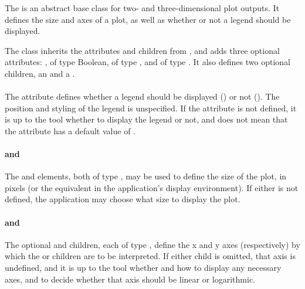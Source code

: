 \begin{blockChanged}


\subsubsection{}
\label{class:plot}
The \Plot is an abstract base class for two- and three-dimensional plot outputs.  It defines the size and axes of a plot, as well as whether or not a legend should be displayed.


The \Plot class inherits the attributes and children from \SedBase, and adds three optional attributes:  , of type Boolean,  of type , and  of type .  It also defines two optional \Axis children, an  and a .

\paragraph*{}
The  attribute defines whether a legend should be displayed () or not ().  The position and styling of the legend is unspecified.  If the attribute is not defined, it is up to the tool whether to display the legend or not, and does not mean that the attribute has a default value of .

\paragraph*{ and }
The  and  elements, both of type , may be used to define the size of the plot, in pixels (or the equivalent in the application's display environment).  If either is not defined, the application may choose what size to display the plot. 

\paragraph*{ and }
The optional  and  children, each of type \Axis, define the x and y axes (respectively) by which the \Curve or \Surface children are to be interpreted.  If either child is omitted, that axis is undefined, and it is up to the tool whether and how to display any necessary axes, and to decide whether that axis should be linear or logarithmic.


\end{blockChanged}
